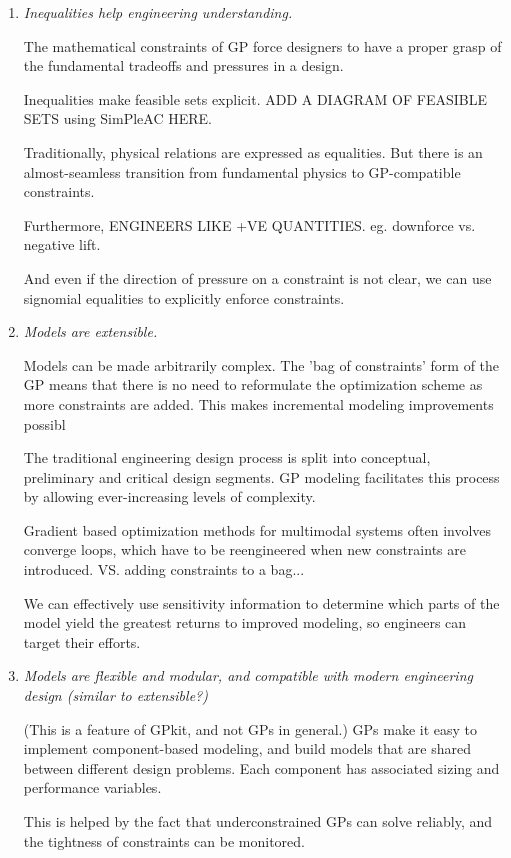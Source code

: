 \begin{enumerate}     \item \textit{Inequalities help engineering
understanding.}

The mathematical constraints of \gls{GP} force designers to have a proper grasp
of the fundamental tradeoffs and pressures in a design.

Inequalities make feasible sets explicit. ADD A DIAGRAM OF FEASIBLE SETS using
SimPleAC HERE.

Traditionally, physical relations are expressed as equalities. But there is an
almost-seamless transition from fundamental physics to GP-compatible
constraints. 

Furthermore, ENGINEERS LIKE +VE QUANTITIES. eg. downforce vs. negative lift.

And even if the direction of pressure on a constraint is not clear, 
we can use signomial equalities to explicitly enforce constraints.

    \item \textit{Models are extensible.}
    
Models can be made arbitrarily complex. The 'bag of constraints' form of the GP
means that there is no need to reformulate the optimization scheme as more
constraints are added. This makes incremental modeling improvements possibl

The traditional engineering design process is split into conceptual, preliminary
and critical design segments. GP modeling facilitates this process by allowing
ever-increasing levels of complexity.

Gradient based optimization methods for multimodal systems often involves
converge loops, which have to be reengineered when new constraints are
introduced. VS. adding constraints to a bag...

We can effectively use sensitivity information to determine which parts of the
model yield the greatest returns to improved modeling, so engineers can target
their efforts.

    \item \textit{Models are flexible and modular, and compatible with modern
    engineering design (similar to extensible?)}

(This is a feature of GPkit, and not GPs in general.) \gls{GP}s make it easy to
implement component-based modeling, and build models that are shared between
different design problems. Each component has associated sizing and performance
variables.

This is helped by the fact that underconstrained \gls{GP}s can solve reliably,
and the tightness of constraints can be monitored.

\end{enumerate}



